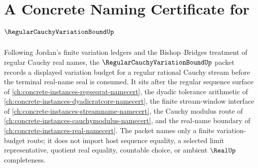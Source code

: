 \chapter{A Concrete Naming Certificate for $\RegularCauchyVariationBoundUp$}
\label{ch:concrete-instances-regular-cauchy-variation-bound-namecert}

Following Jordan's finite variation ledgers and the Bishop--Bridges treatment of regular Cauchy real names, the $\RegularCauchyVariationBoundUp$ packet records a displayed variation budget for a regular rational Cauchy stream before the terminal real-name seal is consumed. It sits after the regular sequence surface of \autoref{ch:concrete-instances-regseqrat-namecert}, the dyadic tolerance arithmetic of \autoref{ch:concrete-instances-dyadicratcore-namecert}, the finite stream-window interface of \autoref{ch:concrete-instances-streamname-namecert}, the Cauchy modulus route of \autoref{ch:concrete-instances-cauchymodulus-namecert}, and the real-name boundary of \autoref{ch:concrete-instances-real-namecert}. The packet names only a finite variation-budget route; it does not import host sequence equality, a selected limit representative, quotient real equality, countable choice, or ambient $\RealUp$ completeness.

